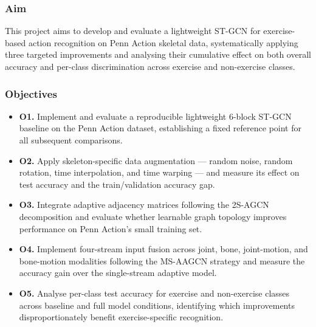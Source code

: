 \subsubsection*{Aim}
This project aims to develop and evaluate a lightweight ST-GCN for exercise-based action recognition on Penn Action skeletal data, systematically applying three targeted improvements and analysing their cumulative effect on both overall accuracy and per-class discrimination across exercise and non-exercise classes.

\subsubsection*{Objectives}
\begin{itemize}
    \item \textbf{O1.} Implement and evaluate a reproducible lightweight 6-block ST-GCN baseline on the Penn Action dataset, establishing a fixed reference point for all subsequent comparisons.
    \item \textbf{O2.} Apply skeleton-specific data augmentation — random noise, random rotation, time interpolation, and time warping — and measure its effect on test accuracy and the train/validation accuracy gap.
    \item \textbf{O3.} Integrate adaptive adjacency matrices following the 2S-AGCN decomposition and evaluate whether learnable graph topology improves performance on Penn Action's small training set.
    \item \textbf{O4.} Implement four-stream input fusion across joint, bone, joint-motion, and bone-motion modalities following the MS-AAGCN strategy and measure the accuracy gain over the single-stream adaptive model.
    \item \textbf{O5.} Analyse per-class test accuracy for exercise and non-exercise classes across baseline and full model conditions, identifying which improvements disproportionately benefit exercise-specific recognition.
\end{itemize}
